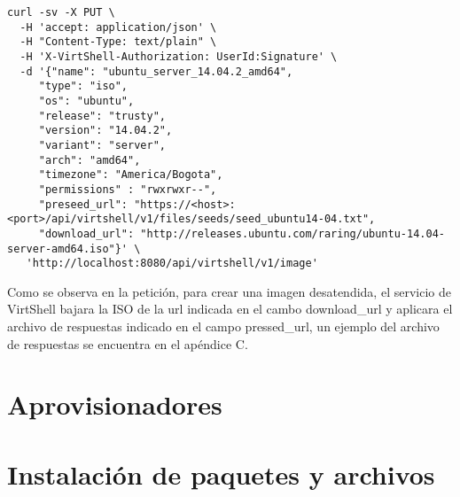 \begin{lstlisting}[style=json, caption=Petición HTTP para crear una imagen]
curl -sv -X PUT \
  -H 'accept: application/json' \
  -H "Content-Type: text/plain" \
  -H 'X-VirtShell-Authorization: UserId:Signature' \
  -d '{"name": "ubuntu_server_14.04.2_amd64",
     "type": "iso",
     "os": "ubuntu", 
     "release": "trusty",
     "version": "14.04.2", 
     "variant": "server", 
     "arch": "amd64", 
     "timezone": "America/Bogota", 
     "permissions" : "rwxrwxr--",
     "preseed_url": "https://<host>:<port>/api/virtshell/v1/files/seeds/seed_ubuntu14-04.txt",
     "download_url": "http://releases.ubuntu.com/raring/ubuntu-14.04-server-amd64.iso"}' \
   'http://localhost:8080/api/virtshell/v1/image'
\end{lstlisting}

Como se observa en la petición, para crear una imagen desatendida, el servicio de VirtShell bajara la ISO de la url indicada en el cambo download\_url y aplicara el archivo de respuestas indicado en el campo pressed\_url, un ejemplo del archivo de respuestas se encuentra en el apéndice C.


\section{Aprovisionadores}

\section{Instalación de paquetes y archivos}



